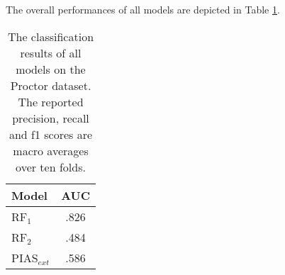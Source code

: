 \documentclass[11pt]{article}
\begin{document}
The overall performances of all models are depicted in Table \ref{tab:proc}. 


\begin{table}[htp]
\centering
\begin{tabular}{lc}
\hline
\textbf{Model}  & \textbf{AUC}\\
\hline
RF$_{1}$ & .826 \\ 
RF$_{2}$  & .484 \\ 

PIAS$_{ext}$  & .586\\ 
\hline
\end{tabular}

\caption{The classification results of all models on the Proctor dataset. The reported precision, recall and f1 scores are macro averages over ten folds.}
\label{tab:proc}
\end{table}
\end{document}
